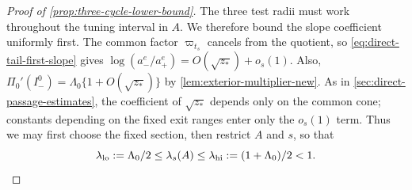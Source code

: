\begin{proof}[Proof of \cref{prop:three-cycle-lower-bound}]
The three test radii must work throughout the tuning interval in
\(A\). We therefore bound the slope coefficient uniformly first.
The common factor
\(\varpi_{t_s}\) cancels from the quotient, so
\eqref{eq:direct-tail-first-slope} gives
\(\log(a_-^e/a_+^e)=O(\sqrt{z_*})+o_s(1)\). Also,
\(\Pi_0'(I_-^0)=\Lambda_0\{1+O(\sqrt{z_*})\}\) by
\cref{lem:exterior-multiplier-new}. As in
\cref{sec:direct-passage-estimates}, the coefficient of \(\sqrt{z_*}\)
depends only on the common cone; constants depending on the fixed
exit ranges enter only the \(o_s(1)\) term. Thus we may first choose
the fixed section, then restrict \(A\) and \(s\), so that
\begin{equation}
\label{eq:sharpness-lambda-range}
 \lambda_{\rm lo}:=\Lambda_0/2
 \le\lambda_s(A)\le
 \lambda_{\rm hi}:=(1+\Lambda_0)/2<1.
\end{equation}


\end{proof}
